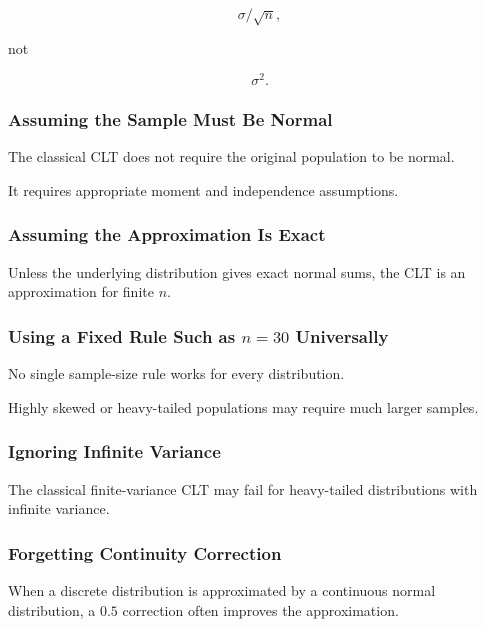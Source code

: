 \[
\sigma/\sqrt{n},
\]

not

\[
\sigma^2.
\]

\subsubsection{Assuming the Sample Must Be Normal}

The classical CLT does not require the original population to be
normal.

It requires appropriate moment and independence assumptions.

\subsubsection{Assuming the Approximation Is Exact}

Unless the underlying distribution gives exact normal sums, the CLT is
an approximation for finite \(n\).

\subsubsection{Using a Fixed Rule Such as \(n=30\) Universally}

No single sample-size rule works for every distribution.

Highly skewed or heavy-tailed populations may require much larger
samples.

\subsubsection{Ignoring Infinite Variance}

The classical finite-variance CLT may fail for heavy-tailed
distributions with infinite variance.

\subsubsection{Forgetting Continuity Correction}

When a discrete distribution is approximated by a continuous normal
distribution, a \(0.5\) correction often improves the approximation.

